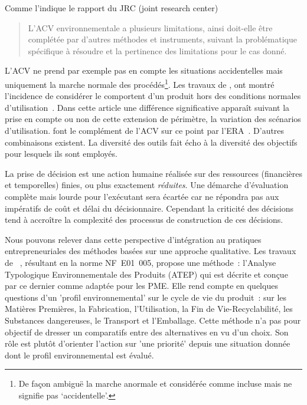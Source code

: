 Comme l'indique le rapport du JRC (joint research center)
\blockcquote[traduction]{jrc_jrc_2012}{L'ACV environnementale a plusieurs limitations, ainsi doit-elle être complétée par d'autres méthodes et instruments, suivant la problématique spécifique à résoudre et la pertinence des limitations pour le cas donné.}
L'ACV ne prend par exemple pas en compte les situations accidentelles mais uniquement la marche normale des procédés\footnote{De façon ambiguë la marche anormale et considérée comme incluse mais ne signifie pas `accidentelle'.}.
Les travaux de \citeauthor{plumblee_marlos_2014}, ont montré l'incidence de considérer le comportent d'un produit hors des conditions normales d'utilisation~\cite{plumblee_marlos_2014}.
Dans cette article une différence significative apparaît suivant la prise en compte ou non de cette extension de périmètre, la variation des scénarios d'utilisation.
\citeauthor{benetto_combining_2007} font le complément de l'ACV sur ce point par l'\gls{ERA}~\cite{benetto_combining_2007}.
D'autres combinaisons existent.
La diversité des outils fait écho à la diversité des objectifs pour lesquels ils sont employés.

La prise de décision est une action humaine réalisée sur des ressources (financières et temporelles) finies, ou plus exactement \emph{réduites}.
Une démarche d'évaluation complète mais lourde pour l'exécutant sera écartée car ne répondra pas aux impératifs de coût et délai du décisionnaire.
Cependant la criticité des décisions tend à accroître la complexité des processus de construction de ces décisions.


Nous pouvons relever dans cette perspective d'intégration au pratiques entrepreneuriales des méthodes basées sur une approche qualitative.
Les travaux de \citeauthor{le_pochat_ecodesign_2005}~\cite{le_pochat_ecodesign_2005}, résultant en la norme NF~E01~005, propose une méthode~: l'Analyse Typologique Environnementale des Produits (ATEP) qui est décrite et conçue par ce dernier comme adaptée pour les PME.
Elle rend compte en quelques questions d'un 'profil environnemental' sur le cycle de vie du produit~: sur les Matières Premières, la Fabrication, l'Utilisation, la Fin de Vie-Recyclabilité, les Substances dangereuses, le Transport et l'Emballage.
Cette méthode n'a pas pour objectif de dresser un comparatifs entre des alternatives en vu d'un choix.
Son rôle est plutôt d'orienter l'action sur 'une priorité' depuis une situation donnée dont le profil environnemental est évalué.

